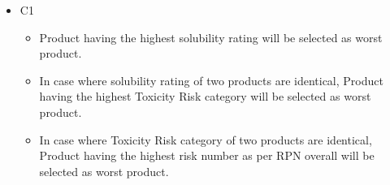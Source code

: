\documentclass{article}
\begin{document}
            \begin{itemize} 
            \item C1
                \begin{itemize}
                
                    \item Product having the highest solubility rating will be selected as worst product.
                
                    \item In case where solubility rating of two products are identical, Product having the highest Toxicity Risk category will be selected as worst product.
                
                    \item In case where Toxicity Risk category of two products are identical, Product having the highest risk number as per RPN overall will be selected as worst product.
                
                \end{itemize}
            \end{itemize}
        
        
        \newpage
\end{document}
